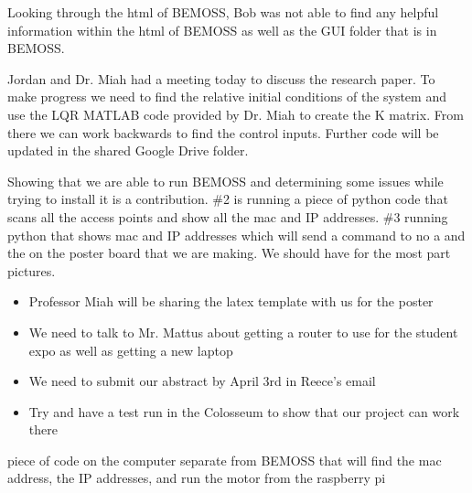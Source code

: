 \documentclass[fontsize=11pt, %
                             paper=letter, %
                             twoside, %
                             captions=tableheading,
                             index=totoc,
                             hyperref]{labbook}
\begin{document}
Looking through the html of BEMOSS, Bob was not able to find any helpful information within the html of BEMOSS as well as the GUI folder that is in BEMOSS.


Jordan and Dr. Miah had a meeting today to discuss the research paper. To make progress we need to find the relative initial conditions of the system and use the LQR MATLAB code provided by Dr. Miah to create the K matrix. From there we can work backwards to find the control inputs. Further code will be updated in the shared Google Drive folder.


Showing that we are able to run BEMOSS and determining some issues while trying to install it is a contribution. \#2 is running a piece of python code that scans all the access points and show all the mac and IP addresses. \#3 running python that shows mac and IP addresses which will send a command to 
no a and the on the poster board that we are making. We should have for the most part pictures. 
\begin{itemize}
    \item Professor Miah will be sharing the latex template with us for the poster
    \item We need to talk to Mr. Mattus about getting a router to use for the student expo as well as getting a new laptop
    \item We need to submit our abstract by April 3rd in Reece's email
    \item Try and have a test run in the Colosseum to show that our project can work there
\end{itemize}

piece of code on the computer separate from BEMOSS that will find the mac address, the IP addresses, and run the motor from the raspberry pi

\end{document}
